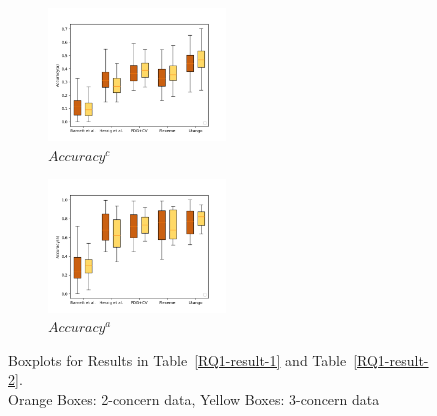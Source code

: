 


\begin{figure}
	\centering
	\begin{subfigure}{0.235\textwidth}
		\centering
		\includegraphics[width=1.85in]{figures/RQ_1_1.png}
                \vspace{-16pt}
		\caption{$Accuracy^c$}
		\label{RQ1-result-3-1}
	\end{subfigure}
	\begin{subfigure}{0.235\textwidth}
		\centering
		\includegraphics[width=1.85in]{figures/RQ_1_2.png}
                \vspace{-16pt}
		\caption{$Accuracy^a$}
		\label{RQ1-result-3-2}
	\end{subfigure}
        \vspace{-12pt}
	\caption{Boxplots for Results in Table~\ref{RQ1-result-1} and Table~\ref{RQ1-result-2}.\\ Orange Boxes: 2-concern data, Yellow Boxes: 3-concern data}
	\label{RQ1-result-3}
\end{figure}

